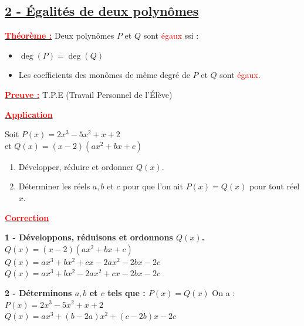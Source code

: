 \documentclass[12pt,a4paper]{article}
\begin{document}
\subsection*{%
    \color{red} \underline{2 - Égalités de deux polynômes}%
}

\textbf{\underline{\textcolor{red}{Théorème :}}} Deux polynômes $P$ et $Q$ sont \textcolor{red}{égaux} ssi :
\begin{itemize}
    \item[i)] $\deg(P) = \deg(Q)$
    \item[ii)] Les coefficients des monômes de même degré de $P$ et $Q$ sont \textcolor{red}{égaux}.
\end{itemize}

\textbf{\underline{\textcolor{red}{Preuve :}}} T.P.E (Travail Personnel de l'Élève)

\vspace{0.5cm}

\begin{center}
    \textbf{\underline{\textcolor{red}{Application}}}
\end{center}

Soit $P(x) = 2x^3 - 5x^2 + x + 2$ \\
et $Q(x) = (x - 2)(ax^2 + bx + c)$

\begin{enumerate}
    \item Développer, réduire et ordonner $Q(x)$.
    \item Déterminer les réels $a, b$ et $c$ pour que l'on ait $P(x) = Q(x)$ pour tout réel $x$.
\end{enumerate}

\begin{center}
    \textbf{\underline{\textcolor{red}{Correction}}}
\end{center}

\textbf{1 - Développons, réduisons et ordonnons $Q(x)$.}
$Q(x) = (x - 2)(ax^2 + bx + c)$ \\
$Q(x) = ax^3 + bx^2 + cx - 2ax^2 - 2bx - 2c$ \\
$Q(x) = ax^3 + bx^2 - 2ax^2 + cx - 2bx - 2c$ \\

\textbf{2 - Déterminons $a, b$ et $c$ tels que : $P(x) = Q(x)$}
On a : \\
$P(x) = 2x^3 - 5x^2 + x + 2$ \\
$Q(x) = ax^3 + (b - 2a)x^2 + (c - 2b)x - 2c$
\end{document}
